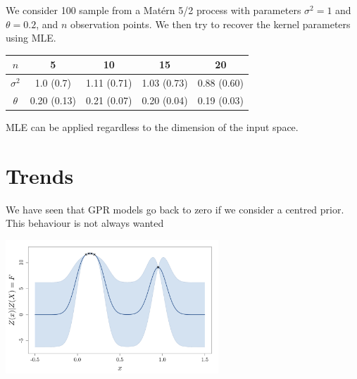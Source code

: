 \documentclass{beamer}
\begin{document}
\begin{frame}{}
\begin{example}
  We consider 100 sample from a  Mat\'ern 5/2 process with parameters $\sigma^2=1$ and $\theta = 0.2$, and $n$ observation points. We then try to recover the kernel parameters using MLE.\\ \vspace{5mm}
  \centering
  \begin{tabular}{|c|cccc|}
    \hline
    $n$ & 5 & 10 & 15 & 20 \\ \hline
    $\sigma^2$ & 1.0 (0.7) & 1.11 (0.71) & 1.03 (0.73) & 0.88 (0.60) \\
    $\theta$ & 0.20 (0.13) & 0.21 (0.07) & 0.20 (0.04) & 0.19 (0.03) \\ \hline
  \end{tabular}
\end{example}
\vspace{5mm}
MLE can be applied regardless to the dimension of the input space.
\end{frame}

\section{Trends}

\begin{frame}{}
We have seen that GPR models go back to zero if we consider a centred prior. \\ \vspace{5mm} This behaviour is not always wanted
\begin{center}
	\includegraphics[height=5cm]{figures/trend_pb2}
\end{center}
\end{frame}
\end{document}
